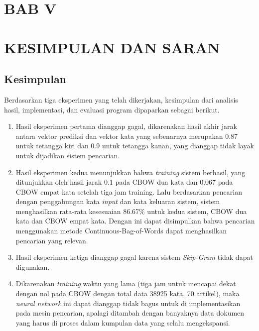 \documentclass[12pt]{report}
\begin{document}
\newpage
\section[KESIMPULAN DAN SARAN]{BAB V}
\section*{KESIMPULAN DAN SARAN}
\thispagestyle{plain}
\subsection{Kesimpulan}
Berdasarkan tiga eksperimen yang telah dikerjakan, kesimpulan dari analisis hasil, implementasi, dan evaluasi program dipaparkan sebagai berikut.
\begin{enumerate}
\item Hasil eksperimen pertama dianggap gagal, dikarenakan hasil akhir jarak antara vektor prediksi dan vektor kata yang sebenarnya merupakan 0.87 untuk tetangga kiri dan 0.9 untuk tetangga kanan, yang dianggap tidak layak untuk dijadikan sistem pencarian. 
\item Hasil eksperimen kedua menunjukkan bahwa \textit{training} sistem berhasil, yang ditunjukkan oleh hasil jarak 0.1 pada CBOW dua kata dan 0.067 pada CBOW empat kata setelah tiga jam training. Lalu berdasarkan pencarian dengan penggabungan kata \textit{input} dan kata keluaran sistem, sistem menghasilkan rata-rata kesesuaian 86.67\% untuk kedua sistem, CBOW dua kata dan CBOW empat kata. Dengan ini dapat disimpulkan bahwa pencarian menggunakan metode Continuous-Bag-of-Words dapat menghasilkan pencarian yang relevan.
\item Hasil eksperimen ketiga dianggap gagal karena sistem \textit{Skip-Gram} tidak dapat digunakan.
\item Dikarenakan \textit{training} waktu yang lama (tiga jam untuk mencapai dekat dengan nol pada CBOW dengan total data 38925 kata, 70 artikel), maka \textit{neural network} ini dapat dianggap tidak bagus untuk di implementasikan pada mesin pencarian, apalagi ditambah dengan banyaknya data dokumen yang harus di proses dalam kumpulan data yang selalu mengekspansi.
\end{enumerate}
\end{document}
